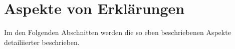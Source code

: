 \section{Aspekte von Erklärungen}

Im den Folgenden Abschnitten werden die so eben beschriebenen Aspekte detailiierter beschrieben.








